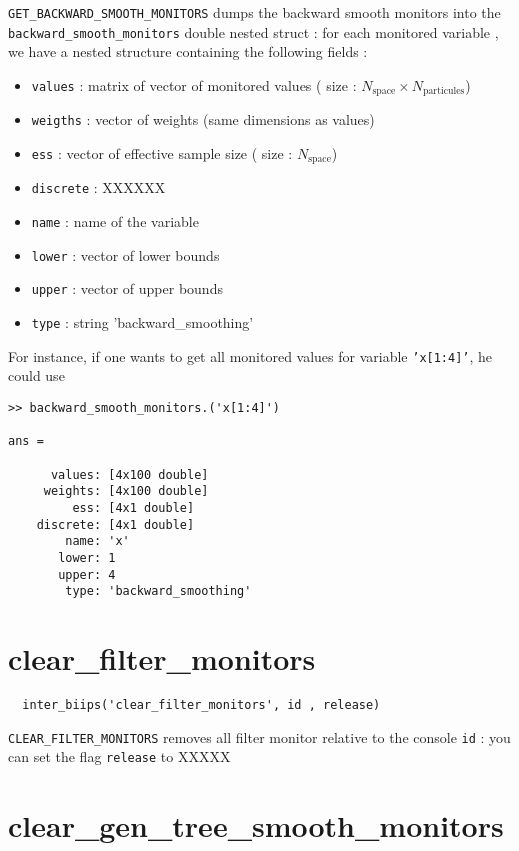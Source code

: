 \documentclass[11pt]{article}
\begin{document}
 \texttt{GET\_BACKWARD\_SMOOTH\_MONITORS} dumps the backward smooth monitors into the \texttt{backward\_smooth\_monitors} double nested struct : for each monitored variable , we have
  a nested structure containing the following fields :

  \begin{itemize}
   \item \texttt{values} : matrix of vector of monitored values ( size : $N_{\mbox{space}} \times N_{\mbox{particules}}$)
   \item \texttt{weigths} : vector of weights (same dimensions as values)
   \item \texttt{ess} : vector of effective  sample size ( size : $N_{\mbox{space}}$)
   \item \texttt{discrete} : XXXXXX
   \item \texttt{name} : name of the variable
   \item \texttt{lower} : vector of lower bounds
   \item \texttt{upper} : vector of upper bounds
   \item \texttt{type} : string 'backward\_smoothing'
   \end{itemize}

  For instance, if one wants to get all monitored values for variable \texttt{'x[1:4]'}, he could use
 \begin{lstlisting}
>> backward_smooth_monitors.('x[1:4]')

ans = 

      values: [4x100 double]
     weights: [4x100 double]
         ess: [4x1 double]
    discrete: [4x1 double]
        name: 'x'
       lower: 1
       upper: 4
        type: 'backward_smoothing'

 \end{lstlisting}

\section{clear\_filter\_monitors}
 
 \begin{lstlisting}
  inter_biips('clear_filter_monitors', id , release) 
 \end{lstlisting}
  
  \texttt{CLEAR\_FILTER\_MONITORS} removes all filter monitor relative to the console \texttt{id} : you can set the flag \texttt{release} to XXXXX

\section{clear\_gen\_tree\_smooth\_monitors}
 
\end{document}
